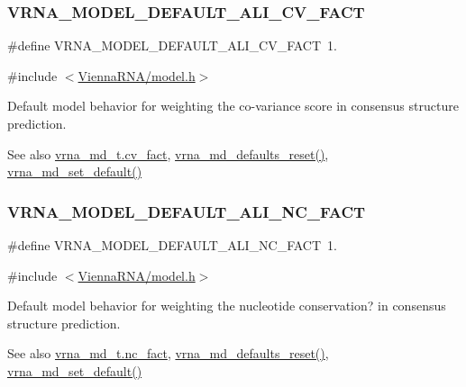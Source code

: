 \subsubsection{\texorpdfstring{VRNA\_MODEL\_DEFAULT\_ALI\_CV\_FACT}{VRNA\_MODEL\_DEFAULT\_ALI\_CV\_FACT}}
{\footnotesize\ttfamily \#define V\+R\+N\+A\+\_\+\+M\+O\+D\+E\+L\+\_\+\+D\+E\+F\+A\+U\+L\+T\+\_\+\+A\+L\+I\+\_\+\+C\+V\+\_\+\+F\+A\+CT~1.}



{\ttfamily \#include $<$\mbox{\hyperlink{model_8h}{Vienna\+R\+N\+A/model.\+h}}$>$}



Default model behavior for weighting the co-\/variance score in consensus structure prediction. 

\begin{DoxySeeAlso}{See also}
\mbox{\hyperlink{group__model__details_a62ebefb9d0643e5c4c8a2ec84a105ce6}{vrna\+\_\+md\+\_\+t.\+cv\+\_\+fact}}, \mbox{\hyperlink{group__model__details_ga70834424cf804d149937de89f80ceb45}{vrna\+\_\+md\+\_\+defaults\+\_\+reset()}}, \mbox{\hyperlink{group__model__details_ga8ac6ff84936282436f822644bf841f66}{vrna\+\_\+md\+\_\+set\+\_\+default()}} 
\end{DoxySeeAlso}
\mbox{\label{group__model__details_ga8f774daaafec28160c1ca5d09f2cbdba}} 
\subsubsection{\texorpdfstring{VRNA\_MODEL\_DEFAULT\_ALI\_NC\_FACT}{VRNA\_MODEL\_DEFAULT\_ALI\_NC\_FACT}}
{\footnotesize\ttfamily \#define V\+R\+N\+A\+\_\+\+M\+O\+D\+E\+L\+\_\+\+D\+E\+F\+A\+U\+L\+T\+\_\+\+A\+L\+I\+\_\+\+N\+C\+\_\+\+F\+A\+CT~1.}



{\ttfamily \#include $<$\mbox{\hyperlink{model_8h}{Vienna\+R\+N\+A/model.\+h}}$>$}



Default model behavior for weighting the nucleotide conservation? in consensus structure prediction. 

\begin{DoxySeeAlso}{See also}
\mbox{\hyperlink{group__model__details_abcf568e6124bfcb2f847ff4eb0dfded6}{vrna\+\_\+md\+\_\+t.\+nc\+\_\+fact}}, \mbox{\hyperlink{group__model__details_ga70834424cf804d149937de89f80ceb45}{vrna\+\_\+md\+\_\+defaults\+\_\+reset()}}, \mbox{\hyperlink{group__model__details_ga8ac6ff84936282436f822644bf841f66}{vrna\+\_\+md\+\_\+set\+\_\+default()}} 
\end{DoxySeeAlso}


